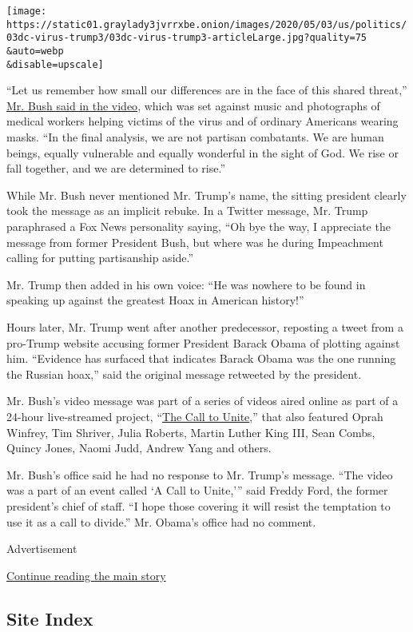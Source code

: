 \texttt{[image: https://static01.graylady3jvrrxbe.onion/images/2020/05/03/us/politics/03dc-virus-trump3/03dc-virus-trump3-articleLarge.jpg?quality=75\\\&auto=webp\\\&disable=upscale]}

``Let us remember how small our differences are in the face of this
shared threat,''
\href{https://twitter.com/TheBushCenter/status/1256607729151619073}{Mr.
Bush said in the video}, which was set against music and photographs of
medical workers helping victims of the virus and of ordinary Americans
wearing masks. ``In the final analysis, we are not partisan combatants.
We are human beings, equally vulnerable and equally wonderful in the
sight of God. We rise or fall together, and we are determined to rise.''

While Mr. Bush never mentioned Mr. Trump's name, the sitting president
clearly took the message as an implicit rebuke. In a Twitter message,
Mr. Trump paraphrased a Fox News personality saying, ``Oh bye the way, I
appreciate the message from former President Bush, but where was he
during Impeachment calling for putting partisanship aside.''

Mr. Trump then added in his own voice: ``He was nowhere to be found in
speaking up against the greatest Hoax in American history!''

Hours later, Mr. Trump went after another predecessor, reposting a tweet
from a pro-Trump website accusing former President Barack Obama of
plotting against him. ``Evidence has surfaced that indicates Barack
Obama was the one running the Russian hoax,'' said the original message
retweeted by the president.

Mr. Bush's video message was part of a series of videos aired online as
part of a 24-hour live-streamed project, ``\href{https://unite.us/}{The
Call to Unite},'' that also featured Oprah Winfrey, Tim Shriver, Julia
Roberts, Martin Luther King III, Sean Combs, Quincy Jones, Naomi Judd,
Andrew Yang and others.

Mr. Bush's office said he had no response to Mr. Trump's message. ``The
video was a part of an event called `A Call to Unite,''' said Freddy
Ford, the former president's chief of staff. ``I hope those covering it
will resist the temptation to use it as a call to divide.'' Mr. Obama's
office had no comment.

Advertisement

\protect\hyperlink{after-bottom}{Continue reading the main story}

\hypertarget{site-index}{%
\subsection{Site Index}\label{site-index}}

